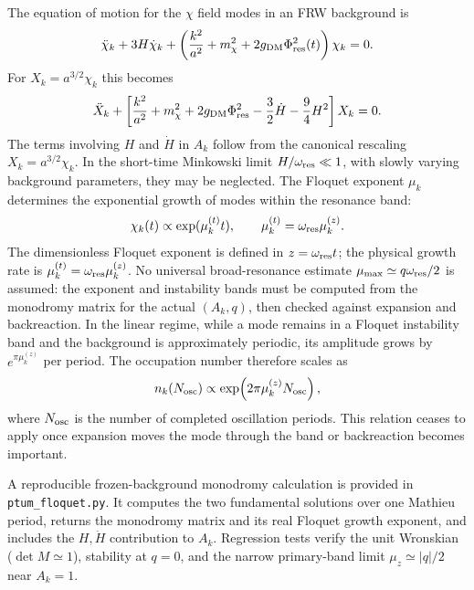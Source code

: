 \documentclass[epj]{svjour}
\begin{document}
\begin{description}
The equation of motion for the $\chi$ field modes in an FRW
background is
\begin{equation}
\ddot\chi_k + 3H\dot\chi_k +
\left(\frac{k^2}{a^2}+m_\chi^2+
2g_{\rm DM}\Phi_{\rm res}^2(t)\right)\chi_k=0.
\end{equation}
For $X_k=a^{3/2}\chi_k$ this becomes
\begin{equation}
\ddot X_k+\left[\frac{k^2}{a^2}+m_\chi^2+
2g_{\rm DM}\Phi_{\rm res}^2
-\frac{3}{2}\dot H-\frac{9}{4}H^2\right]X_k=0.
\end{equation}
The terms involving \(H\) and \(\dot H\) in \(A_k\) follow from
the canonical rescaling \(X_k=a^{3/2}\chi_k\). In the short-time
Minkowski limit \(H/\omega_{\rm res}\ll1\), with slowly varying
background parameters, they may be neglected. The Floquet exponent $\mu_k$ determines the
exponential growth of modes within the resonance band:
\begin{equation}
\chi_k(t) \propto \exp(\mu_k^{(t)} t),
\qquad \mu_k^{(t)}=\omega_{\rm res}\mu_k^{(z)}.
\end{equation}
The dimensionless Floquet exponent is defined in $z=\omega_{\rm res}t$;
the physical growth rate is $\mu_k^{(t)}=\omega_{\rm res}\mu_k^{(z)}$.
No universal broad-resonance estimate $\mu_{\rm max}\simeq
q\omega_{\rm res}/2$ is assumed: the exponent and instability bands
must be computed from the monodromy matrix for the actual $(A_k,q)$,
then checked against expansion and backreaction. In the linear regime, while a mode remains in a Floquet
instability band and the background is approximately periodic, its
amplitude grows by \(e^{\pi\mu_k^{(z)}}\) per period. The occupation
number therefore scales as
\begin{equation}
n_k(N_{\rm osc})\propto
\exp\!\left(2\pi\mu_k^{(z)}N_{\rm osc}\right),
\end{equation}
where \(N_{\rm osc}\) is the number of completed oscillation periods.
This relation ceases to apply once expansion moves the mode through
the band or backreaction becomes important.

A reproducible frozen-background monodromy calculation is
provided in \texttt{ptum\_floquet.py}. It computes the two fundamental
solutions over one Mathieu period, returns the monodromy matrix and
its real Floquet growth exponent, and includes the \(H,\dot H\)
contribution to \(A_k\). Regression tests verify the unit Wronskian
(\(\det M\simeq1\)), stability at \(q=0\), and the narrow primary-band
limit \(\mu_z\simeq |q|/2\) near \(A_k=1\).


\end{description}
\end{document}
